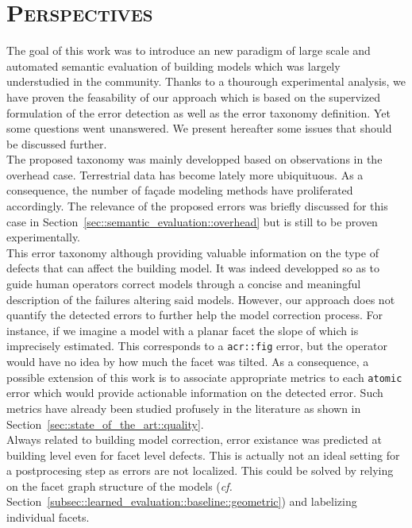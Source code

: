 \section{\textsc{Perspectives}}
    \label{sec::conclusion::perspectives}
    The goal of this work was to introduce an new paradigm of large scale and automated semantic evaluation of building models which was largely understudied in the community.
    Thanks to a thourough experimental analysis, we have proven the feasability of our approach which is based on the supervized formulation of the error detection as well as the error taxonomy definition.
    Yet some questions went unanswered.
    We present hereafter some issues that should be discussed further.\\

    The proposed taxonomy was mainly developped based on observations in the overhead case.
    Terrestrial data has become lately more ubiquituous.
    As a consequence, the number of façade modeling methods have proliferated accordingly.
    The relevance of the proposed errors was briefly discussed for this case in Section~\ref{sec::semantic_evaluation::overhead} but is still to be proven experimentally.\\

    This error taxonomy although providing valuable information on the type of defects that can affect the building model.
    It was indeed developped so as to guide human operators correct models through a concise and meaningful description of the failures altering said models.
    However, our approach does not quantify the detected errors to further help the model correction process.
    For instance, if we imagine a model with a planar facet the slope of which is imprecisely estimated.
    This corresponds to a \texttt{\acrfull{acr::fig}} error, but the operator would have no idea by how much the facet was tilted.
    As a consequence, a possible extension of this work is to associate appropriate metrics to each \texttt{atomic} error which would provide actionable information on the detected error.
    Such metrics have already been studied profusely in the literature as shown in Section~\ref{sec::state_of_the_art::quality}.\\

    Always related to building model correction, error existance was predicted at building level even for facet level defects.
    This is actually not an ideal setting for a postprocesing step as errors are not localized.
    This could be solved by relying on the facet graph structure of the models (\textit{cf.} Section~\ref{subsec::learned_evaluation::baseline::geometric}) and labelizing individual facets.\\

